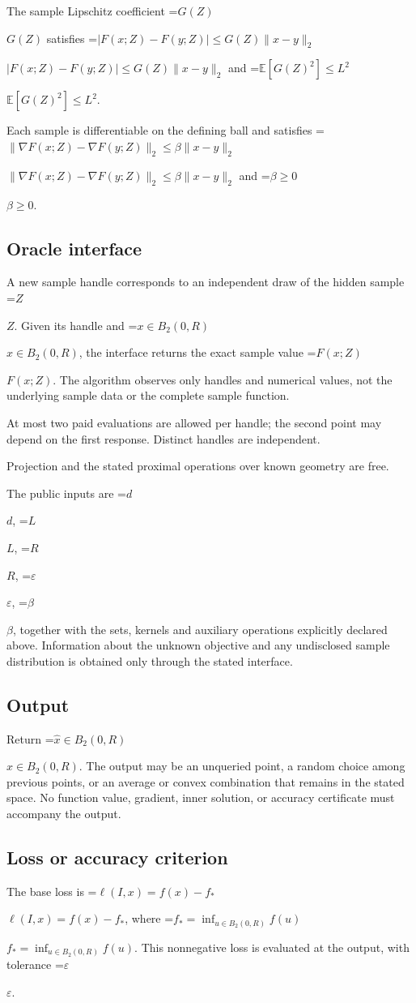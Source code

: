 \documentclass[10pt,a4paper]{article}
\newcommand{\AtlasMath}[1]{\par\begingroup\centering\setbox0=\hbox{$\displaystyle #1$}\ifdim\wd0>1.4\linewidth\typeout{ATLAS WIDE FORMULA: \the\wd0}\fi\ifdim\wd0>\linewidth\resizebox{\linewidth}{!}{\box0}\else\box0\fi\par\endgroup}
\newcommand{\AtlasInlineMath}[1]{\begingroup\setbox0=\hbox{$#1$}\ifdim\wd0>.4\linewidth\endgroup\AtlasMath{#1}\else\endgroup$#1$\fi}
\begin{document}
The sample Lipschitz coefficient \AtlasInlineMath{G(Z)} satisfies \AtlasInlineMath{|F(x;Z)-F(y;Z)|\le G(Z)\|x-y\|_2} and \AtlasInlineMath{\mathbb{E}[G(Z)^2]\le L^2}.

Each sample is differentiable on the defining ball and satisfies \AtlasInlineMath{\|\nabla F(x;Z)-\nabla F(y;Z)\|_2\le\beta\|x-y\|_2} and \AtlasInlineMath{\beta\ge0}.

\subsection{Oracle interface}
A new sample handle corresponds to an independent draw of the hidden sample \AtlasInlineMath{Z}. Given its handle and \AtlasInlineMath{x\in B_2(0,R)}, the interface returns the exact sample value \AtlasInlineMath{F(x;Z)}. The algorithm observes only handles and numerical values, not the underlying sample data or the complete sample function.

At most two paid evaluations are allowed per handle; the second point may depend on the first response. Distinct handles are independent.

Projection and the stated proximal operations over known geometry are free.

The public inputs are \AtlasInlineMath{d}, \AtlasInlineMath{L}, \AtlasInlineMath{R}, \AtlasInlineMath{\varepsilon}, \AtlasInlineMath{\beta}, together with the sets, kernels and auxiliary operations explicitly declared above. Information about the unknown objective and any undisclosed sample distribution is obtained only through the stated interface.

\subsection{Output}
Return \AtlasInlineMath{\widehat{x}\in B_2(0,R)}. The output may be an unqueried point, a random choice among previous points, or an average or convex combination that remains in the stated space. No function value, gradient, inner solution, or accuracy certificate must accompany the output.

\subsection{Loss or accuracy criterion}
The base loss is \AtlasInlineMath{\ell(I,x)=f(x)-f_*}, where \AtlasInlineMath{f_*=\inf_{u\in B_2(0,R)}f(u)}. This nonnegative loss is evaluated at the output, with tolerance \AtlasInlineMath{\varepsilon}.
\end{document}
